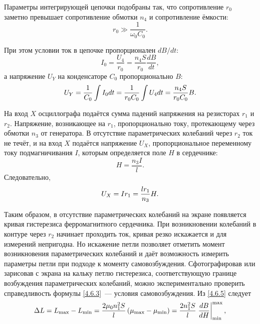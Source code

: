 Параметры интегрирующей цепочки подобраны так, что сопротивление $r_0$ заметно
превышает сопротивление обмотки $n_4$ и сопротивление ёмкости:
\begin{equation*}
	r_0 \gg \frac{1}{\omega_0C_0}.
\end{equation*}

 При этом условии ток в цепочке пропорционален $dB/dt$:
\begin{equation*}
	I_0 = \frac{U_4}{r_0} = \frac{n_4S}{r_0}\frac{dB}{dt},
\end{equation*}
а напряжение $U_Y$ на конденсаторе $C_0$ пропорционально $B$:
\begin{equation}
	\eqmark{4.6.6}
	U_Y = \frac{1}{C_0}\int I_0dt = \frac{1}{r_0C_0}\int U_4dt =
\frac{n_4S}{r_0C_0}B.
\end{equation}

На вход $X$ осциллографа подаётся сумма падений напряжения на резисторах $r_1$ и
$r_2$. Напряжение, возникающее на $r_1$, пропорционально току, протекающему
через обмотки $n_3$ от генератора. В отсутствие параметрических колебаний через
$r_2$ ток не течёт, и на вход $X$ подаётся напряжение $U_X$, пропорциональное
переменному току подмагничивания $I$, которым определяется поле $H$ в
сердечнике:
\begin{equation*}
	H = \frac{n_3I}{l}.
\end{equation*}
Следовательно,
\begin{equation}
	\eqmark{4.6.7}
	U_X = Ir_1 = \frac{lr_1}{n_3}H.
\end{equation}

Таким образом, в отсутствие параметрических колебаний на экране появляется
кривая гистерезиса ферромагнитного сердечника. При возникновении колебаний в
контуре через $r_2$ начинает проходить ток, кривая резко искажается и для
измерений непригодна. Но искажение петли позволяет отметить момент возникновения
параметрических колебаний и даёт возможность измерить параметры петли при
подходе к моменту самовозбуждения. Сфотографировав или зарисовав с экрана на кальку петлю
гистерезиса, соответствующую границе возбуждения параметрических колебаний,
можно экспериментально проверить справедливость формулы \eqref{4.6.3}~---
условия самовозбуждения. Из \eqref{4.6.5} следует
\begin{equation}
	\eqmark{4.6.8}
		\Delta L = L_{\rm max} - L_{\rm min} =
        \frac{2\mu_0n^2_1S}{l}\left(\mu_{\rm max} - \mu_{\rm min}\right)
		= \frac{2n^2_1S}{l}
        \left.\frac{dB}{dH}\right|_{\rm min}^{\rm max},
\end{equation}

